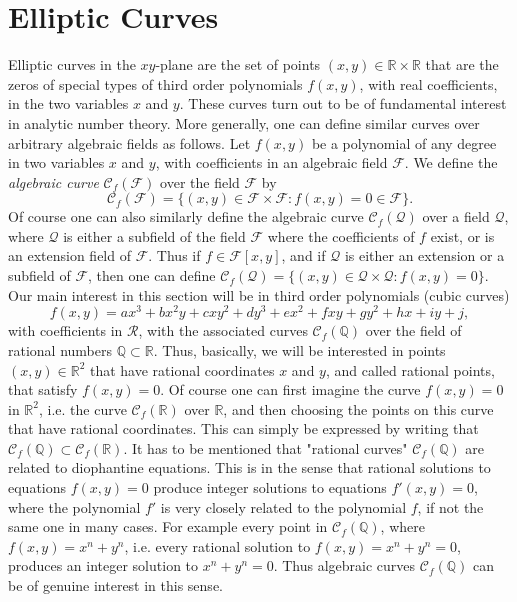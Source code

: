 \documentclass[12pt,letterpaper]{book}
\begin{document}
\section{Elliptic Curves}
Elliptic curves in the $xy$-plane are the set of points
$(x,y)\in\mathbb{R}\times\mathbb{R}$ that are the zeros of special
types of third order polynomials $f(x,y)$, with real coefficients,
in the two variables $x$ and $y$. These curves turn out to be of
fundamental interest in analytic number theory. More generally, one
can define similar curves over arbitrary algebraic fields as
follows. Let $f(x,y)$ be a polynomial of any degree in two variables
$x$ and $y$, with coefficients in an algebraic field $\mathcal{F}$.
We define the {\it algebraic curve} $\mathscr{C}_f(\mathcal{F})$
over the field $\mathcal{F}$ by
\begin{equation}
\mathscr{C}_f(\mathcal{F})=\{(x,y)\in\mathcal{F}\times\mathcal{F}:f(x,y)=0\in
\mathcal{F}\}.
\end{equation}
Of course one can also similarly define the algebraic curve
$\mathscr{C}_f(\mathcal{Q})$ over a field $\mathcal{Q}$, where
$\mathcal{Q}$ is either a subfield of the field $\mathcal{F}$ where
the coefficients of $f$ exist, or is an extension field of
$\mathcal{F}$. Thus if $f\in\mathcal{F}[x,y]$, and if $\mathcal{Q}$
is either an extension or a subfield of $\mathcal{F}$, then one can
define
$\mathscr{C}_f(\mathcal{Q})=\{(x,y)\in\mathcal{Q}\times\mathcal{Q}:f(x,y)=0\}$.
 Our main interest in this section will be in
third order polynomials (cubic curves)
\begin{equation}
f(x,y)=ax^3+bx^2y+cxy^2+dy^3+ex^2+fxy+gy^2+hx+iy+j,
\end{equation}
with coefficients in $\mathcal{R}$, with the associated curves
$\mathscr{C}_f(\mathbb{Q})$ over the field of rational numbers
$\mathbb{Q}\subset\mathbb{R}$. Thus, basically, we will be
interested in points $(x,y)\in\mathbb{R}^2$ that have rational
coordinates $x$ and $y$, and called rational points, that satisfy
$f(x,y)=0$. Of course one can first imagine the curve $f(x,y)=0$ in
$\mathbb{R}^2$, i.e. the curve $\mathscr{C}_f(\mathbb{R})$ over
$\mathbb{R}$, and then choosing the points on this curve that have
rational coordinates. This can simply be expressed by writing that
$\mathscr{C}_f(\mathbb{Q})\subset\mathscr{C}_f(\mathbb{R})$.
 It has to be mentioned that "rational
curves" $\mathscr{C}_f(\mathbb{Q})$ are related to diophantine
equations. This is in the sense that rational solutions to equations
$f(x,y)=0$ produce integer solutions to equations $f'(x,y)=0$, where
the polynomial $f'$ is very closely related to the polynomial $f$,
if not the same one in many cases. For example every point in
$\mathscr{C}_f(\mathbb{Q})$,  where $f(x,y)=x^n+y^n$, i.e. every
rational solution to $f(x,y)=x^n+y^n=0$, produces an integer
solution to $x^n+y^n=0$. Thus algebraic curves
$\mathscr{C}_f(\mathbb{Q})$ can be of genuine interest in this
sense.
\end{document}
